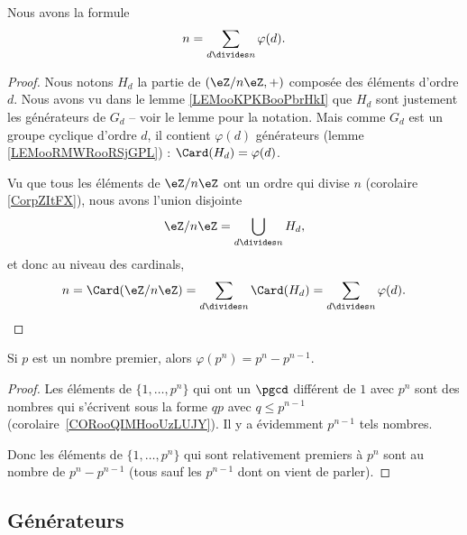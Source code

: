 \begin{proposition}       \label{PROPooYHUDooUROTiN}
	Nous avons la formule
	\begin{equation}        \label{EqTPHqgJ}
		n=\sum_{d\divides n}\varphi(d).
	\end{equation}
\end{proposition}

\begin{proof}
	Nous notons \( H_d\) la partie de \( (\eZ/n\eZ,+)\) composée des éléments d'ordre \( d\). Nous avons vu dans le lemme \ref{LEMooKPKBooPbrHkI} que \( H_d\) sont justement les générateurs de \( G_d\) -- voir le lemme pour la notation. Mais comme \( G_d\) est un groupe cyclique d'ordre \( d\), il contient \( \varphi(d)\) générateurs (lemme \ref{LEMooRMWRooRSjGPL}) : \( \Card(H_d)=\varphi(d)\).

	Vu que tous les éléments de \( \eZ/n\eZ\) ont un ordre qui divise \( n\) (corolaire \ref{CorpZItFX}), nous avons l'union disjointe
	\begin{equation}
		\eZ/n\eZ=\bigcup_{d\divides n}H_d,
	\end{equation}
	et donc au niveau des cardinals,
	\begin{equation}
		n=\Card(\eZ/n\eZ)=\sum_{d\divides n}\Card(H_d)=\sum_{d\divides n}\varphi(d).
	\end{equation}
\end{proof}


\begin{lemma}       \label{LEMooBEJOooDqTirj}
	Si \( p\) est un nombre premier, alors \( \varphi(p^n)=p^n-p^{n-1}\).
\end{lemma}

\begin{proof}
	Les éléments de \( \{ 1,\ldots,p^n \}\) qui ont un \( \pgcd\) différent de \( 1\) avec \( p^n\) sont des nombres qui s'écrivent sous la forme \( qp\) avec \( q\leq p^{n-1}\) (corolaire~\ref{CORooQIMHooUzLUJY}). Il y a évidemment \( p^{n-1}\) tels nombres.

	Donc les éléments de \( \{ 1,\ldots,p^n \} \) qui sont relativement premiers à \( p^n\) sont au nombre de \( p^n-p^{n-1}\) (tous sauf les \( p^{n-1}\) dont on vient de parler).
\end{proof}


\subsection{Générateurs}

